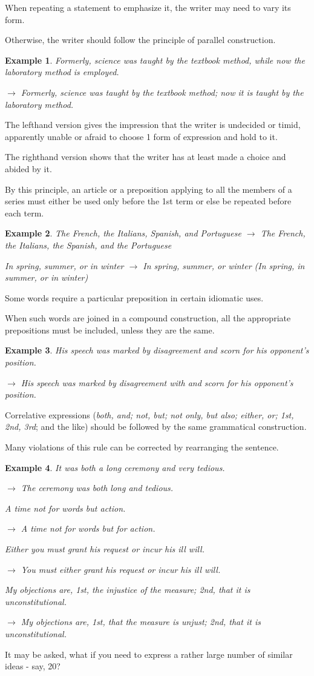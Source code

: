 \documentclass{book}
\numberwithin{equation}{section}
\newtheorem{example}{Example}[chapter]
\begin{document}
When repeating a statement to emphasize it, the writer may need to vary its form.

Otherwise, the writer should follow the principle of parallel construction.
\begin{example}
    Formerly, science was taught by the textbook method, while now the laboratory method is employed.
    
    $\to$ Formerly, science was taught by the textbook method; now it is taught by the laboratory method.
\end{example}
The lefthand version gives the impression that the writer is undecided or timid, apparently unable or afraid to choose 1 form of expression and hold to it.

The righthand version shows that the writer has at least made a choice and abided by it.

%
By this principle, an article or a preposition applying to all the members of a series must either be used only before the 1st term or else be repeated before each term.
\begin{example}
    The French, the Italians, Spanish, and Portuguese $\to$ The French, the Italians, the Spanish, and the Portuguese
    
    In spring, summer, or in winter $\to$ In spring, summer, or winter (In spring, in summer, or in winter)
\end{example}
Some words require a particular preposition in certain idiomatic uses.

When such words are joined in a compound construction, all the appropriate prepositions must be included, unless they are the same.
\begin{example}
    His speech was marked by disagreement and scorn for his opponent's position.
    
    $\to$ His speech was marked by disagreement with and scorn for his opponent's position.
\end{example}
Correlative expressions (\textit{both, and; not, but; not only, but also; either, or; 1st, 2nd, 3rd}; and the like) should be followed by the same grammatical construction.

Many violations of this rule can be corrected by rearranging the sentence.
\begin{example}
    It was both a long ceremony and very tedious.
    
    $\to$ The ceremony was both long and tedious.
    
    A time not for words but action.
    
    $\to$ A time not for words but for action.
    
    Either you must grant his request or incur his ill will.
    
    $\to$ You must either grant his request or incur his ill will.
    
    My objections are, 1st, the injustice of the measure; 2nd, that it is unconstitutional.
    
    $\to$ My objections are, 1st, that the measure is unjust; 2nd, that it is unconstitutional.
\end{example}
It may be asked, what if you need to express a rather large number of similar ideas - say, 20?
\end{document}
